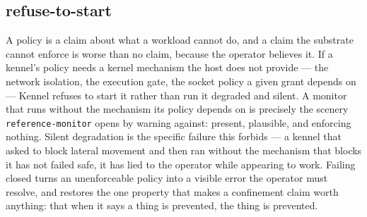 \hypertarget{refuse-to-start}{%
\subsection{\texorpdfstring{refuse-to-start}{refuse-to-start}}\label{refuse-to-start}}

A policy is a claim about what a workload cannot do, and a claim the
substrate cannot enforce is worse than no claim, because the operator
believes it. If a kennel's policy needs a kernel mechanism the host does
not provide --- the network isolation, the execution gate, the socket
policy a given grant depends on --- Kennel refuses to start it rather
than run it degraded and silent. A monitor that runs without the
mechanism its policy depends on is precisely the scenery
\texttt{reference-monitor} opens by warning against: present, plausible,
and enforcing nothing. Silent degradation is the specific failure this
forbids --- a kennel that asked to block lateral movement and then ran
without the mechanism that blocks it has not failed safe, it has lied to
the operator while appearing to work. Failing closed turns an
unenforceable policy into a visible error the operator must resolve, and
restores the one property that makes a confinement claim worth anything:
that when it says a thing is prevented, the thing is prevented.
